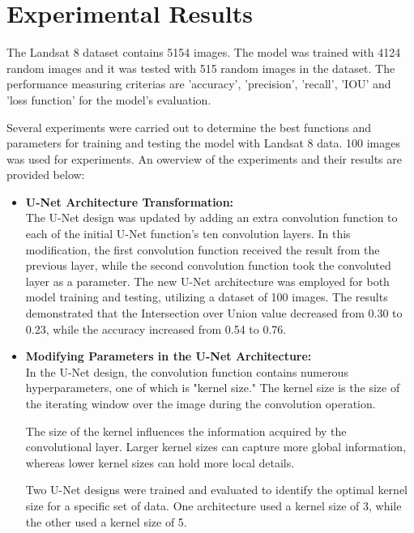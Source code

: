 \chapter{Experimental Results}

The Landsat 8 dataset contains 5154 images. The model was trained with 4124 random images and it was tested with 515 random images in the dataset. The performance measuring criterias are 'accuracy', 'precision', 'recall', 'IOU' and 'loss function' for the model's evaluation. 

Several experiments were carried out to determine the best functions and parameters for training and testing the model with Landsat 8 data. 100 images was used for experiments. An owerview of the experiments and their results are provided below:

\begin{itemize}
    \item \textbf{U-Net Architecture Transformation:}\\
    
        The U-Net design was updated by adding an extra convolution function to each of the initial U-Net function's ten convolution layers. In this modification, the first convolution function received the result from the previous layer, while the second convolution function took the convoluted layer as a parameter. The new U-Net architecture was employed for both model training and testing, utilizing a dataset of 100 images. The results demonstrated that the Intersection over Union value decreased from 0.30 to 0.23, while the accuracy increased from 0.54 to 0.76.
        \\
    \item \textbf{Modifying Parameters in the U-Net Architecture:}\\
    
        In the U-Net design, the convolution function contains numerous hyperparameters, one of which is "kernel size." The kernel size is the size of the iterating window over the image during the convolution operation.

        The size of the kernel influences the information acquired by the convolutional layer. Larger kernel sizes can capture more global information, whereas lower kernel sizes can hold more local details.

        Two U-Net designs were trained and evaluated to identify the optimal kernel size for a specific set of data. One architecture used a kernel size of 3, while the other used a kernel size of 5.
        

\end{itemize}

